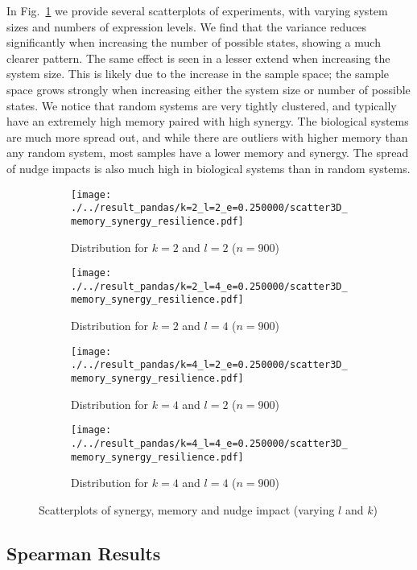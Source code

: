 \documentclass[../main.tex]{subfiles}
\begin{document}
In Fig.~\ref{fig:3dscatter} we provide several scatterplots of experiments, with varying system sizes and numbers of expression levels.
We find that the variance reduces significantly when increasing the number of possible states, showing a much clearer pattern.
The same effect is seen in a lesser extend when increasing the system size.
This is likely due to the increase in the sample space; the sample space grows strongly when increasing either the system size or number of possible states.
We notice that random systems are very tightly clustered, and typically have an extremely high memory paired with high synergy.
The biological systems are much more spread out, and while there are outliers with higher memory than any random system, most samples have a lower memory and synergy.
The spread of nudge impacts is also much high in biological systems than in random systems.

\begin{figure}[H]
    \centering
    \begin{subfigure}[b]{0.45\textwidth}
        \texttt{[image: ./../result\_pandas/k=2\_l=2\_e=0.250000/scatter3D\_memory\_synergy\_resilience.pdf]}
        \caption{Distribution for $k=2$ and $l=2$ ($n=900$)}
    \end{subfigure}
    \begin{subfigure}[b]{0.45\textwidth}
        \texttt{[image: ./../result\_pandas/k=2\_l=4\_e=0.250000/scatter3D\_memory\_synergy\_resilience.pdf]}
        \caption{Distribution for $k=2$ and $l=4$ ($n=900$)}
    \end{subfigure}
\bigskip
    \begin{subfigure}[b]{0.45\textwidth}
        \texttt{[image: ./../result\_pandas/k=4\_l=2\_e=0.250000/scatter3D\_memory\_synergy\_resilience.pdf]}
        \caption{Distribution for $k=4$ and $l=2$ ($n=900$)}
    \end{subfigure}
    \begin{subfigure}[b]{0.45\textwidth}
        \texttt{[image: ./../result\_pandas/k=4\_l=4\_e=0.250000/scatter3D\_memory\_synergy\_resilience.pdf]}
        \caption{Distribution for $k=4$ and $l=4$ ($n=900$)}
    \end{subfigure}
    \caption{Scatterplots of synergy, memory and nudge impact (varying $l$ and $k$)}
    \label{fig:3dscatter}
\end{figure}

\subsection{Spearman Results}
\end{document}
